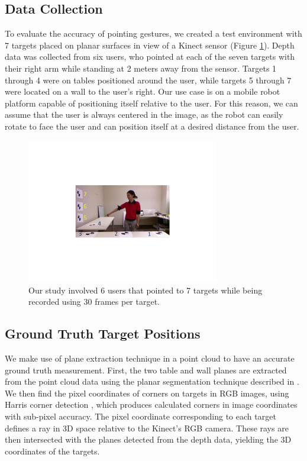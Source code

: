  
\subsection{Data Collection}
\label{sec:pointing_data_collection}

To evaluate the accuracy of pointing gestures, we created a test environment with 7 targets placed on planar surfaces in view of a Kinect sensor (Figure \ref{fig:ground_truth_targets}). Depth data was collected from six users, who pointed at each of the seven targets with their right arm while standing at 2 meters away from the sensor. Targets 1 through 4 were on tables positioned around the user, while targets 5 through 7 were located on a wall to the user's right. Our use case is on a mobile robot platform capable of positioning itself relative to the user.  For this reason, we can assume that the user is always centered in the image, as the robot can easily rotate to face the user and can position itself at a desired distance from the user.

\begin{figure}[ht!]
\centering
\includegraphics[width=0.75\textwidth]{pics/data_collection_crop}
\caption{Our study involved 6 users that pointed to 7 targets while being recorded using 30 frames per target.}
\label{fig:ground_truth_targets}
\end{figure}

\subsection{Ground Truth Target Positions}
\label{sec:ground_truth_points}

We make use of plane extraction technique in a point cloud to have an accurate ground truth measurement. First, the two table and wall planes are extracted from the point cloud data using the planar segmentation technique described in \cite{trevor2013segmentation}. We then find the pixel coordinates of corners on targets in RGB images, using Harris corner detection \cite{harris1988combined}, which produces calculated corners in image coordinates with sub-pixel accuracy. The pixel coordinate corresponding to each target defines a ray in 3D space relative to the Kinect's RGB camera. These rays are then intersected with the planes detected from the depth data, yielding the 3D coordinates of the targets.



